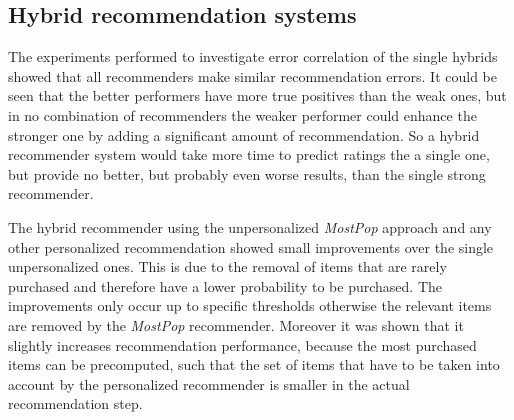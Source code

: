 \documentclass[10pt]{reportMaster}
\begin{document}
\subsection{Hybrid recommendation systems}
\label{sec:discHybrid}
The experiments performed to investigate error correlation of the single hybrids showed that all recommenders make similar recommendation errors.
It could be seen that the better performers have more true positives than the weak ones, but in no combination of recommenders the weaker performer could enhance the stronger one by adding a significant amount of recommendation.
So a hybrid recommender system would take more time to predict ratings the a single one, but provide no better, but probably even worse results, than the single strong recommender.

The hybrid recommender using the unpersonalized \textit{MostPop} approach and any other personalized recommendation showed small improvements over the single unpersonalized ones.
This is due to the removal of items that are rarely purchased and therefore have a lower probability to be purchased.
The improvements only occur up to specific thresholds otherwise the relevant items are removed by the \textit{MostPop} recommender.
Moreover it was shown that it slightly increases recommendation performance, because the most purchased items can be precomputed, such that the set of items that have to be taken into account by the personalized recommender is smaller in the actual recommendation step.



\end{document}
